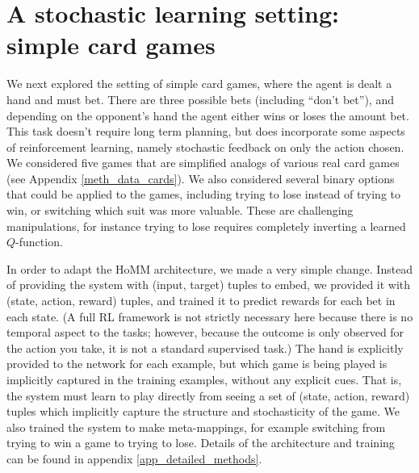 \documentclass{article}
\begin{document}
\section{A stochastic learning setting: simple card games}\label{sec_cards}
We next explored the setting of simple card games, where the agent is dealt a hand and must bet. There are three possible bets (including ``don't bet''), and depending on the opponent's hand the agent either wins or loses the amount bet. This task doesn't require long term planning, but does incorporate some aspects of reinforcement learning, namely stochastic feedback on only the action chosen. We considered five games that are simplified analogs of various real card games (see Appendix \ref{meth_data_cards}). We also considered several binary options that could be applied to the games, including trying to lose instead of trying to win, or switching which suit was more valuable. These are challenging manipulations, for instance trying to lose requires completely inverting a learned $Q$-function. \par
In order to adapt the HoMM architecture, we made a very simple change. Instead of providing the system with (input, target) tuples to embed, we provided it with (state, action, reward) tuples, and trained it to predict rewards for each bet in each state. (A full RL framework is not strictly necessary here because there is no temporal aspect to the tasks; however, because the outcome is only observed for the action you take, it is not a standard supervised task.) The hand is explicitly provided to the network for each example, but which game is being played is implicitly captured in the training examples, without any explicit cues. That is, the system must learn to play directly from seeing a set of (state, action, reward) tuples which implicitly capture the structure and stochasticity of the game. We also trained the system to make meta-mappings, for example switching from trying to win a game to trying to lose. Details of the architecture and training can be found in appendix \ref{app_detailed_methods}. \par
\end{document}

